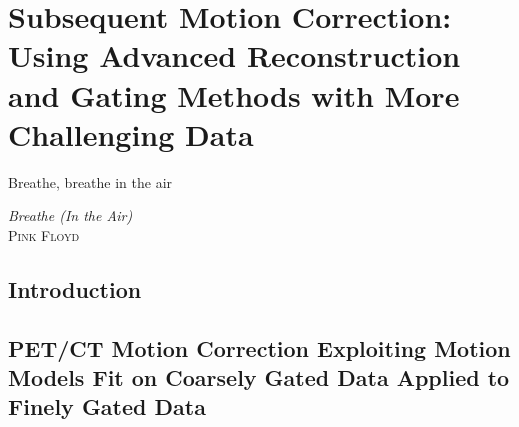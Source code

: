 \chapter{Subsequent Motion Correction: Using Advanced Reconstruction and Gating Methods with More Challenging Data} \label{sec:subsequent_motion_correction_using_advanced_reconstruction_and_gating_methods_with_more_challenging_data}
    \vspace*{\fill}
    \setlength{\epigraphwidth}{0.3\linewidth}
    \renewcommand{\epigraphflush}{flushright}
    \renewcommand{\epigraphsize}{\footnotesize}
    \epigraph{Breathe, breathe in the air}%
              {\textit{Breathe (In the Air)}\\ \textsc{Pink Floyd}}
    
    \newpage
    
    \section{Introduction} \label{sec:subsequent_motion_correction_using_advanced_reconstruction_and_gating_methods_with_more_challenging_data_introduction}
        
    
    \section{PET/CT Motion Correction Exploiting Motion Models Fit on Coarsely Gated Data Applied to Finely Gated Data} \label{sec:pet_ct_motion_correction_exploiting_motion_models_fit_on_coarsely_gated_data_applied_to_finely_gated_data}


